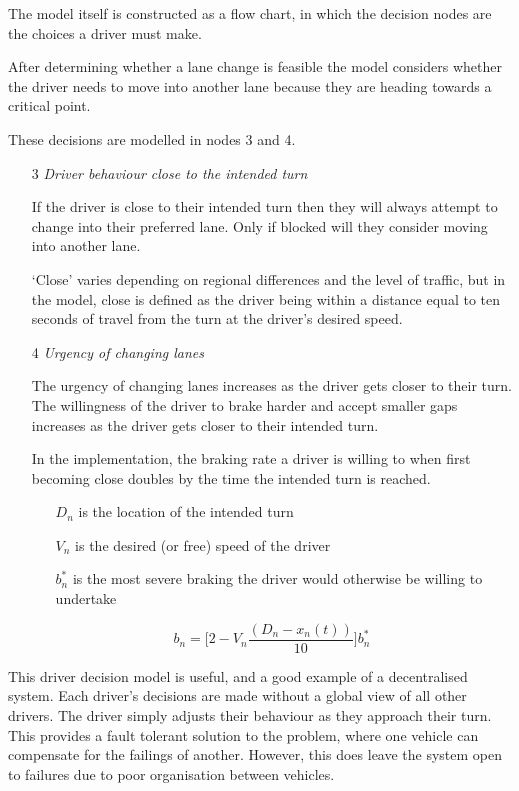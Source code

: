 The model itself is constructed as a flow chart, in which the decision nodes are the choices a driver must make. 


After determining whether a lane change is feasible the model considers whether the driver needs to move into another lane because they are heading towards a critical point.

These decisions are modelled in nodes 3 and 4.

\begin{enumerate}
\item[3] \textit{Driver behaviour close to the intended turn}

If the driver is close to their intended turn then they will always attempt to change into their preferred lane. Only if blocked will they consider moving into another lane. 

`Close' varies depending on regional differences and the level of traffic, but in the model, close is defined as the driver being within a distance equal to ten seconds of travel from the turn at the driver's desired speed.

\item[4] \textit{Urgency of changing lanes}

The urgency of changing lanes increases as the driver gets closer to their turn. The willingness of the driver to brake harder and accept smaller gaps increases as the driver gets closer to their intended turn.

In the implementation, the braking rate a driver is willing to when first becoming close doubles by the time the intended turn is reached. 

\begin{itemize}
\item[$D_n$] is the location of the intended turn
\item[$V_n$] is the desired (or free) speed of the driver
\item[$b_n^*$] is the most severe braking the driver would otherwise be willing to undertake
\end{itemize}

\begin{equation*}
b_n = \Biggl[2 - V_n\frac{(D_n - x_n(t))}{10}\Biggr]b_n^*
\end{equation*}

\end{enumerate}

This driver decision model is useful, and a good example of a decentralised system. Each driver's decisions are made without a global view of all other drivers. The driver simply adjusts their behaviour as they approach their turn. This provides a fault tolerant solution to the problem, where one vehicle can compensate for the failings of another. However, this does leave the system open to failures due to poor organisation between vehicles. 

